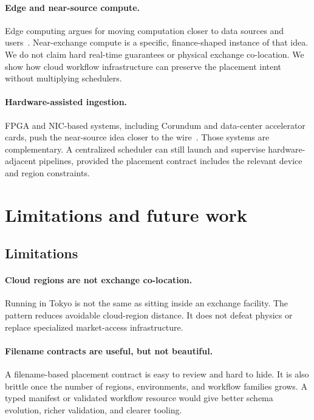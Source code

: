 \documentclass[11pt, reqno]{amsart}
\begin{document}
\paragraph{Edge and near-source compute.}
Edge computing argues for moving computation closer to data sources and users~\cite{promise_edge_computing}. Near-exchange compute is a specific, finance-shaped instance of that idea. We do not claim hard real-time guarantees or physical exchange co-location. We show how cloud workflow infrastructure can preserve the placement intent without multiplying schedulers.

\paragraph{Hardware-assisted ingestion.}
FPGA and NIC-based systems, including Corundum and data-center accelerator cards, push the near-source idea closer to the wire~\cite{corundum_paper,corundum_repo,alveo_u250}. Those systems are complementary. A centralized scheduler can still launch and supervise hardware-adjacent pipelines, provided the placement contract includes the relevant device and region constraints.

\section{Limitations and future work}
\label{sec:limitations}

\subsection{Limitations}

\paragraph{Cloud regions are not exchange co-location.}
Running in Tokyo is not the same as sitting inside an exchange facility. The pattern reduces avoidable cloud-region distance. It does not defeat physics or replace specialized market-access infrastructure.

\paragraph{Filename contracts are useful, but not beautiful.}
A filename-based placement contract is easy to review and hard to hide. It is also brittle once the number of regions, environments, and workflow families grows. A typed manifest or validated workflow resource would give better schema evolution, richer validation, and clearer tooling.
\end{document}
